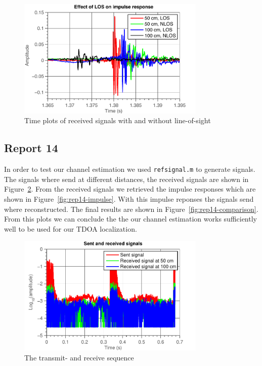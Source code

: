 \documentclass[11pt,titlepage]{report}
\begin{document}
\begin{figure}[H]
	\centering
	\includegraphics[width=0.8\textwidth]{../../deliverable-7-resources/figures/ass-1/report-11-12-13/ass-1-report-13-los-nlos.pdf}
	\caption{Time plots of received signals with and without line-of-sight}
	\label{fig:rep13-nlos}
\end{figure}





\subsection{Report 14}
In order to test our channel estimation we used \texttt{refsignal.m} to generate signals. The signals where send at different distances, the received signals are shown in Figure~\ref{fig:rep14-tx-rx}. From the received signals we retrieved the impulse responses which are shown in Figure~\ref{fig:rep14-impulse}. With this impulse reponses the signals send where reconstructed. The final results are shown in Figure~\ref{fig:rep14-comparison}. From this plots we can conclude the the our channel estimation works sufficiently well to be used for our TDOA localization. 

\begin{figure}[H]
	\centering
	\includegraphics[width=0.8\textwidth]{../../deliverable-7-resources/figures/ass-1/report-14-15/ass-1-report-14-sent-received.pdf}
	\caption{The transmit- and receive sequence}
	\label{fig:rep14-tx-rx}
\end{figure}
\end{document}
